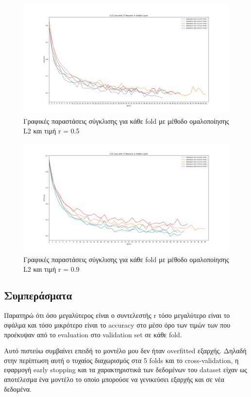 \documentclass[12pt,a4paper]{article}
\begin{document}
\begin{figure}[H]
	\includegraphics[width=\textwidth]{29. L2 with r = 0.5.png}
	\caption{Γραφικές παραστάσεις σύγκλισης για κάθε fold με μέθοδο ομαλοποίησης L2 και τιμή r = 0.5}
\end{figure}

\begin{figure}[H]
	\includegraphics[width=\textwidth]{30. L2 with r = 0.9.png}
	\caption{Γραφικές παραστάσεις σύγκλισης για κάθε fold με μέθοδο ομαλοποίησης L2 και τιμή r = 0.9}
\end{figure}

\subsection{Συμπεράσματα}

Παρατηρώ ότι όσο μεγαλύτερος είναι ο συντελεστής r τόσο μεγαλύτερο είναι το σφάλμα και τόσο μικρότερο είναι το accuracy στο μέσο όρο των τιμών των που προέκυψαν από το evaluation στο validation set σε κάθε fold. 

Αυτό πιστεύω συμβαίνει επειδή το μοντέλο μου δεν ήταν overfitted εξαρχής. Δηλαδή στην περίπτωση αυτή ο τυχαίος διαχωρισμός στα 5 folds και το cross-validation, η εφαρμογή early stopping και τα χαρακτηριστικά των δεδομένων του dataset είχαν ως αποτέλεσμα ένα μοντέλο το οποίο μπορούσε να γενικεύσει εξαρχής και σε νέα δεδομένα.
\end{document}
